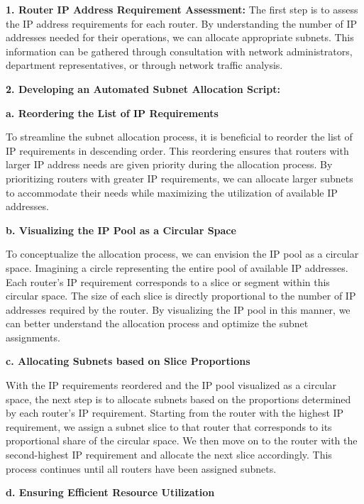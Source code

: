 \textbf{1. Router IP Address Requirement Assessment:} The first step is to assess the IP address requirements for each router. By understanding the number of IP addresses needed for their operations, we can allocate appropriate subnets. This information can be gathered through consultation with network administrators, department representatives, or through network traffic analysis.

\textbf{2. Developing an Automated Subnet Allocation Script:}


\textbf{a. Reordering the List of IP Requirements}

To streamline the subnet allocation process, it is beneficial to reorder the list of IP requirements in descending order. This reordering ensures that routers with larger IP address needs are given priority during the allocation process. By prioritizing routers with greater IP requirements, we can allocate larger subnets to accommodate their needs while maximizing the utilization of available IP addresses.

\textbf{b. Visualizing the IP Pool as a Circular Space}

To conceptualize the allocation process, we can envision the IP pool as a circular space. Imagining a circle representing the entire pool of available IP addresses. Each router's IP requirement corresponds to a slice or segment within this circular space. The size of each slice is directly proportional to the number of IP addresses required by the router. By visualizing the IP pool in this manner, we can better understand the allocation process and optimize the subnet assignments.


\textbf{c. Allocating Subnets based on Slice Proportions}

With the IP requirements reordered and the IP pool visualized as a circular space, the next step is to allocate subnets based on the proportions determined by each router's IP requirement. Starting from the router with the highest IP requirement, we assign a subnet slice to that router that corresponds to its proportional share of the circular space. We then move on to the router with the second-highest IP requirement and allocate the next slice accordingly. This process continues until all routers have been assigned subnets.

\textbf{d. Ensuring Efficient Resource Utilization}

